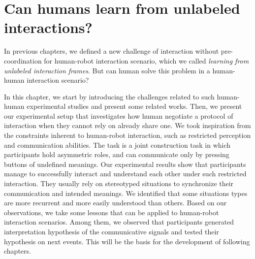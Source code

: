 
\chapter{Can humans learn from unlabeled interactions?}
\label{chapter:humanexperiment}
\minitoc


In previous chapters, we defined a new challenge of interaction without pre-coordination for human-robot interaction scenario, which we called \emph{learning from unlabeled interaction frames}. But can human solve this problem in a human-human interaction scenario?

In this chapter, we start by introducing the challenges related to such human-human experimental studies and present some related works. Then, we present our experimental setup that investigates how human negotiate a protocol of interaction when they cannot rely on already share one. We took inspiration from the constraints inherent to human-robot interaction, such as restricted perception and communication abilities. The task is a joint construction task in which participants hold asymmetric roles, and can communicate only by pressing buttons of undefined meanings. Our experimental results show that participants manage to successfully interact and understand each other under such restricted interaction. They usually rely on stereotyped situations to synchronize their communication and intended meanings. We identified that some situations types are more recurrent and more easily understood than others. Based on our observations, we take some lessons that can be applied to human-robot interaction scenarios. Among them, we observed that participants generated interpretation hypothesis of the communicative signals and tested their hypothesis on next events. This will be the basis for the development of following chapters. 

